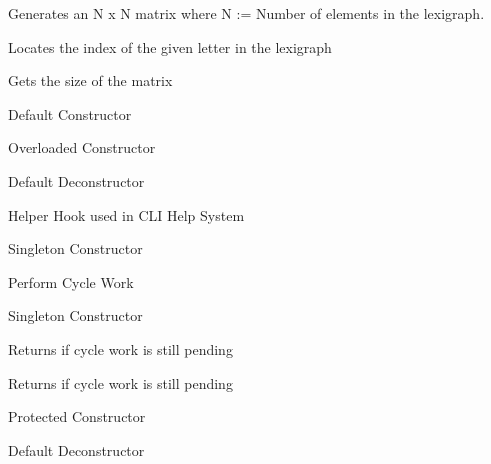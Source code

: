 \begin{DoxyRefList}
\item[Member \mbox{\hyperlink{classxCiphers_adec10429127b58b5980d76f5364f7470}{x\+Ciphers\+::generate\+Matrix}} (char)]\label{todo__todo000035}%
%
Generates an N x N matrix where N \+:= Number of elements in the lexigraph.  
\item[Member \mbox{\hyperlink{classxCiphers_a6262463a0e235edc15f9e9669ce1acfe}{x\+Ciphers\+::get\+Index}} (char)]\label{todo__todo000034}%
%
Locates the index of the given letter in the lexigraph  
\item[Member \mbox{\hyperlink{classxCiphers_aeaf0cc6df8f4311e7d78bf20fa43367c}{x\+Ciphers\+::get\+Matrix\+Size}} ()]\label{todo__todo000036}%
%
Gets the size of the matrix  
\item[Member \mbox{\hyperlink{classxCiphers_ac3cb3f87a08a7cfb39395ef2bf31aad6}{x\+Ciphers\+::x\+Ciphers}} ()]\label{todo__todo000032}%
%
Default Constructor  
\item[Member \mbox{\hyperlink{classxCiphers_a00a0f817604750bb2695f2e23143cf51}{x\+Ciphers\+::x\+Ciphers}} (char, std\+::string)]\label{todo__todo000033}%
%
Overloaded Constructor  
\item[Member \mbox{\hyperlink{classxCiphers_a38ade0d7701361e1132711d1c25b4d00}{x\+Ciphers\+::$\sim$x\+Ciphers}} ()]\label{todo__todo000040}%
%
Default Deconstructor  
\item[Member \mbox{\hyperlink{classxClock_a4d86925f4754c28273d109c96445fd88}{x\+Clock\+::\+\_\+help}} ()]\label{todo__todo000045}%
%
Helper Hook used in CLI Help System  
\item[Member \mbox{\hyperlink{classxClock_a3b6d8cf061eb54a9f98914825cb54936}{x\+Clock\+::do\+Cycle\+Work}} ()]\label{todo__todo000044}%
%
Singleton Constructor 

\label{todo__todo000048}%
%
Perform Cycle Work  
\item[Member \mbox{\hyperlink{classxClock_a5afe719005df1e0e5636074aca239722}{x\+Clock\+::Get\+Instance}} ()]\label{todo__todo000042}%
%
Singleton Constructor  
\item[Member \mbox{\hyperlink{classxClock_a287dd4484683620263e1dd0deaeb63e4}{x\+Clock\+::get\+Pending\+Work\+State}} ()]\label{todo__todo000043}%
%
Returns if cycle work is still pending 

\label{todo__todo000047}%
%
Returns if cycle work is still pending  
\item[Member \mbox{\hyperlink{classxClock_a5ca92a56b37b60eaa5bea735348017b1}{x\+Clock\+::x\+Clock}} ()]\label{todo__todo000041}%
%
Protected Constructor  
\item[Member \mbox{\hyperlink{classxClock_a48548a87fc20d734d49d069f821c29de}{x\+Clock\+::$\sim$x\+Clock}} ()]\label{todo__todo000046}%
%
Default Deconstructor 
\end{DoxyRefList}